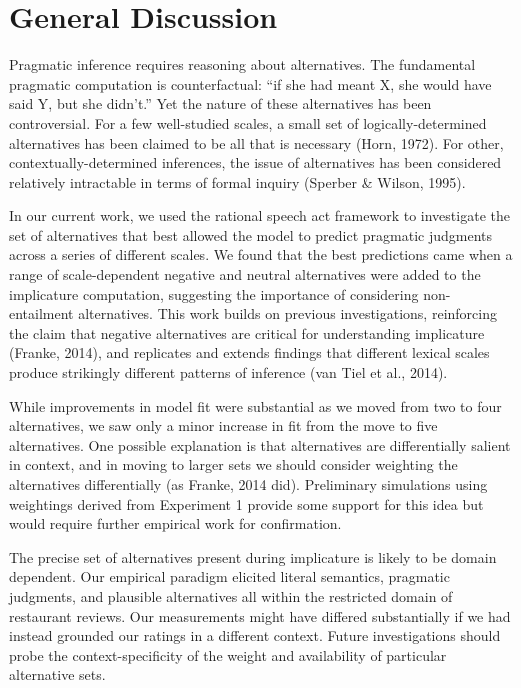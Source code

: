 \documentclass[10pt, letterpaper]{article}
\begin{document}
\section{General Discussion}\label{general-discussion}

Pragmatic inference requires reasoning about alternatives. The
fundamental pragmatic computation is counterfactual: ``if she had meant
X, she would have said Y, but she didn't.'' Yet the nature of these
alternatives has been controversial. For a few well-studied scales, a
small set of logically-determined alternatives has been claimed to be
all that is necessary (Horn, 1972). For other, contextually-determined
inferences, the issue of alternatives has been considered relatively
intractable in terms of formal inquiry (Sperber \& Wilson, 1995).

In our current work, we used the rational speech act framework to
investigate the set of alternatives that best allowed the model to
predict pragmatic judgments across a series of different scales. We
found that the best predictions came when a range of scale-dependent
negative and neutral alternatives were added to the implicature
computation, suggesting the importance of considering non-entailment
alternatives. This work builds on previous investigations, reinforcing
the claim that negative alternatives are critical for understanding
implicature (Franke, 2014), and replicates and extends findings that
different lexical scales produce strikingly different patterns of
inference (van Tiel et al., 2014).

While improvements in model fit were substantial as we moved from two to
four alternatives, we saw only a minor increase in fit from the move to
five alternatives. One possible explanation is that alternatives are
differentially salient in context, and in moving to larger sets we
should consider weighting the alternatives differentially (as Franke,
2014 did). Preliminary simulations using weightings derived from
Experiment 1 provide some support for this idea but would require
further empirical work for confirmation.

The precise set of alternatives present during implicature is likely to
be domain dependent. Our empirical paradigm elicited literal semantics,
pragmatic judgments, and plausible alternatives all within the
restricted domain of restaurant reviews. Our measurements might have
differed substantially if we had instead grounded our ratings in a
different context. Future investigations should probe the
context-specificity of the weight and availability of particular
alternative sets.
\end{document}
